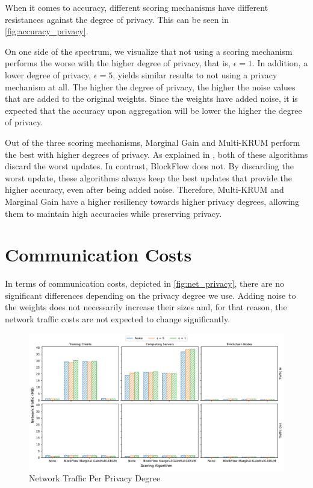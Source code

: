 When it comes to accuracy, different scoring mechanisms have different resistances against the degree of privacy. This can be seen in \autoref{fig:accuracy_privacy}.

On one side of the spectrum, we visualize that not using a scoring mechanism performs the worse with the higher degree of privacy, that is, $\epsilon = 1$. In addition, a lower degree of privacy, $\epsilon = 5$, yields similar results to not using a privacy mechanism at all. The higher the degree of privacy, the higher the noise values that are added to the original weights. Since the weights have added noise, it is expected that the accuracy upon aggregation will be lower the higher the degree of privacy.

Out of the three scoring mechanisms, Marginal Gain and Multi-KRUM perform the best with higher degrees of privacy. As explained in , both of these algorithms discard the worst updates. In contrast, BlockFlow does not. By discarding the worst update, these algorithms always keep the best updates that provide the higher accuracy, even after being added noise. Therefore, Multi-KRUM and Marginal Gain have a higher resiliency towards higher privacy degrees, allowing them to maintain high accuracies while preserving privacy.

\section{Communication Costs}

In terms of communication costs, depicted in \autoref{fig:net_privacy}, there are no significant differences depending on the privacy degree we use. Adding noise to the weights does not necessarily increase their sizes and, for that reason, the network traffic costs are not expected to change significantly.

\begin{figure}[!h]
    \centering
    \includegraphics[width=\textwidth]{graphics/privacy/traffic.pdf}
    \caption{Network Traffic Per Privacy Degree}
    \label{fig:net_privacy}
\end{figure}

